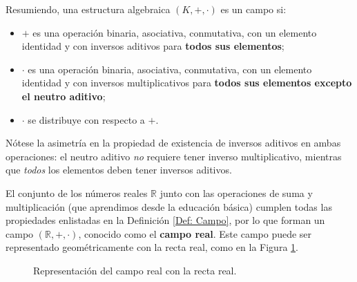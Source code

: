 \documentclass[notasLineal]{subfiles}
\begin{document}
\begin{Obs}\label{obs:1.3}

 Resumiendo, una estructura algebraica $(K,+,\cdot)$ es un campo si:
   \begin{itemize}
        \item $+$ es una operación binaria, asociativa, conmutativa, con un elemento identidad y con inversos aditivos para \textbf{todos sus elementos};

        \item $\cdot$ es una operación binaria, asociativa, conmutativa, con un elemento identidad y con inversos multiplicativos para \textbf{todos sus elementos excepto el neutro aditivo};

        \item $\cdot$ se distribuye con respecto a $+$.
    \end{itemize}

\noindent Nótese la asimetría en la propiedad de existencia de inversos aditivos en ambas operaciones: el neutro aditivo \emph{no} requiere tener inverso multiplicativo, mientras que \emph{todos} los elementos deben tener inversos aditivos.
\end{Obs}

\begin{Ejem}\label{Ejem: Campo real}

    El conjunto de los números reales $\mathbb{R}$ junto con las operaciones de suma y multiplicación (que aprendimos desde la educación básica) cumplen todas las propiedades enlistadas en la Definición \ref{Def: Campo}, por lo que forman un campo $(\mathbb{R},+,\cdot)$, conocido como el \textbf{campo real}. Este campo puede ser representado geométricamente con la recta real, como en la Figura \ref{fig: Campo real}. \\

    \begin{figure}[h!]
        \centering
        \caption{Representación del campo real con la recta real.} 
        \label{fig: Campo real}
    \end{figure}
\end{Ejem}
\end{document}
